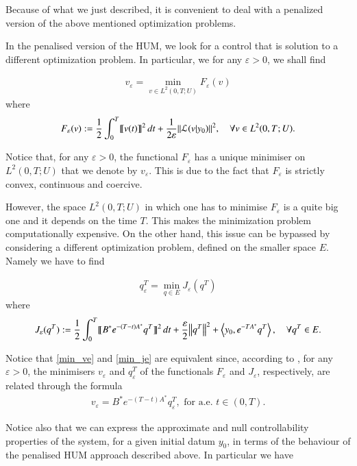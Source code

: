 Because of what we just described, it is convenient to deal with a penalized version of the above mentioned optimization problems.

In the penalised version of the HUM, we look for a control that is solution to a different optimization problem. In particular, we for any $\varepsilon>0$, we shall find

\begin{align}\label{min_ve}
	v_\varepsilon=\min_{v\in L^2(0,T;U)} F_\varepsilon (v)
\end{align}
where
\begin{align*}
	F_\varepsilon(v):=\frac{1}{2}\int_0^T\llbracket v(t)\rrbracket^2\,dt+\frac{1}{2\varepsilon}{\left\|\mathcal L(v|y_0)\right\|}_{}^2, \quad \forall v\in L^2(0,T;U).
\end{align*}

Notice that, for any $\varepsilon > 0$, the functional $F_\varepsilon$ has a unique minimiser on $L^2(0,T;U)$  that we denote by $v_\varepsilon$. This is due to the fact that $F_\varepsilon$ is strictly convex, continuous and coercive. 

However, the space $L^2(0,T;U)$ in which one has to minimise $F_\varepsilon$ is a quite big one and it depends on the time $T$. This makes the minimization problem computationally expensive. On the other hand, this issue can be bypassed by considering a different optimization problem, defined on the smaller space $E$. Namely we have to find  

\begin{align}\label{min_je}
	q^T_\varepsilon=\min_{q\in E} J_\varepsilon (q^T)
\end{align}
where
\begin{align*}
	J_\varepsilon(q^T):=\frac{1}{2}\int_0^T\llbracket B^*e^{-(T-t)A^*}q^T\rrbracket^2\,dt+\frac{\varepsilon}{2}{\left\|q^T\right\|}_{}^2 + \left\langle y_0,e^{-TA^*}q^T\right\rangle, \quad \forall q^T\in E.
\end{align*}

Notice that \eqref{min_ve} and \eqref{min_je} are equivalent since, according to \cite[Proposition 1.5]{boyer2013penalised}, for any $\varepsilon > 0$, the minimisers $v_\varepsilon$ and $q_\varepsilon^T$ of the functionals $F_\varepsilon$ and $J_\varepsilon$, respectively, are related through the formula
\begin{align*}
	v_\varepsilon = B^*e^{-(T-t)A^*}q_\varepsilon^T, \textrm{ for a.e. } t\in(0,T).
\end{align*} 

Notice also that we can express the approximate and null controllability properties of the system, for a given initial datum $y_0$, in terms of the behaviour of the penalised HUM approach described above. In particular we have 

